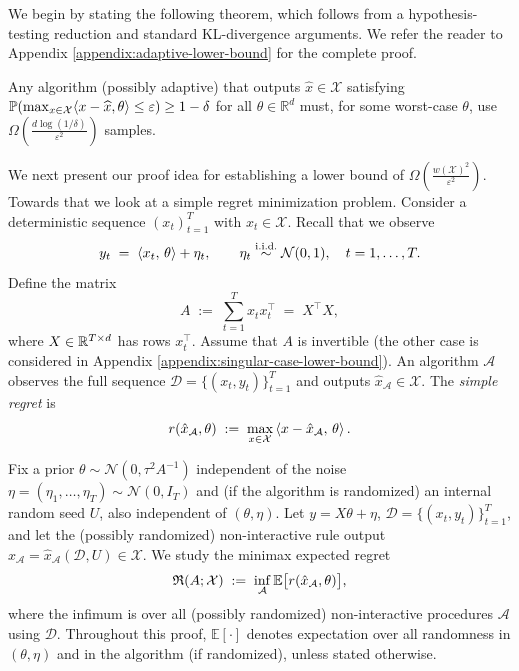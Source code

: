 We begin by stating the following theorem, which follows from a hypothesis-testing reduction and standard KL-divergence arguments. We refer the reader to Appendix \ref{appendix:adaptive-lower-bound} for the complete proof.
\begin{theorem}\label{thm:adaptive-lower-bound}
Any algorithm (possibly adaptive) that outputs $\widehat x\in\mathcal{X}$ satisfying $\mathbb{P}\!\left(\max_{x\in\mathcal{X}}\langle x-\widehat{x},\theta\rangle\le \varepsilon\right)\ge 1-\delta$ for all $\theta\in\mathbb{R}^d$ must, for some worst-case $\theta$, use $\Omega\!\left(\frac{d\log(1/\delta)}{\varepsilon^2}\right)$ samples.
\end{theorem}
We next present our proof idea for establishing a lower bound of $\Omega\left(\frac{w(\mathcal{X})^2}{\varepsilon^2}\right)$. Towards that we look at a simple regret minimization problem. Consider a deterministic sequence
$(x_t)_{t=1}^T$ with $x_t\in \mathcal{X}$. Recall that we observe
\[
y_t \;=\; \left\langle x_t,\,\theta \right\rangle+\eta_t,\qquad \eta_t\stackrel{\text{i.i.d.}}{\sim}\mathcal N(0,1),\quad t=1,\dots,T.
\]
Define the matrix
\[
A \;:=\; \sum_{t=1}^T x_t x_t^\top \;=\; X^\top X,
\]
where $X\in\mathbb{R}^{T\times d}$ has rows $x_t^\top$. Assume that $A$ is invertible (the other case is considered in Appendix \ref{appendix:singular-case-lower-bound}).
An algorithm $\mathcal{A}$ observes the full sequence $\mathcal{D}=\{(x_t,y_t)\}_{t=1}^T$ and outputs $\hat x_{\mathcal{A}}\in \mathcal{X}$.
The \emph{simple regret} is
\[
r(\hat x_{\mathcal{A}},\theta) \;:=\; \max_{x\in \mathcal{X}}\left\langle x-\hat x_{\mathcal{A}},\,\theta \right\rangle.
\]

Fix a prior $\theta \sim \mathcal N(0,\tau^2 A^{-1})$ independent of the noise
$\eta=(\eta_1,\dots,\eta_T)\sim\mathcal N(0,I_T)$ and (if the algorithm is randomized)
an internal random seed $U$, also independent of $(\theta,\eta)$.
Let $y=X\theta+\eta$, $\mathcal D=\{(x_t,y_t)\}_{t=1}^T$, and let the (possibly randomized)
non-interactive rule output $\hat x_{\mathcal{A}}=\hat x_{\mathcal{A}}(\mathcal D,U)\in\mathcal X$. We study the minimax expected regret
\[
\mathfrak R(A;\mathcal{X}) \;:=\; \inf_{\mathcal A}\mathbb{E}\big[r(\hat x_{\mathcal{A}},\theta)\big],
\]
where the infimum is over all (possibly randomized) non-interactive procedures $\mathcal A$ using $\mathcal{D}$. Throughout this proof, $\mathbb E[\cdot]$ denotes expectation over all randomness in $(\theta,\eta)$ and in the algorithm (if randomized), unless stated otherwise.

